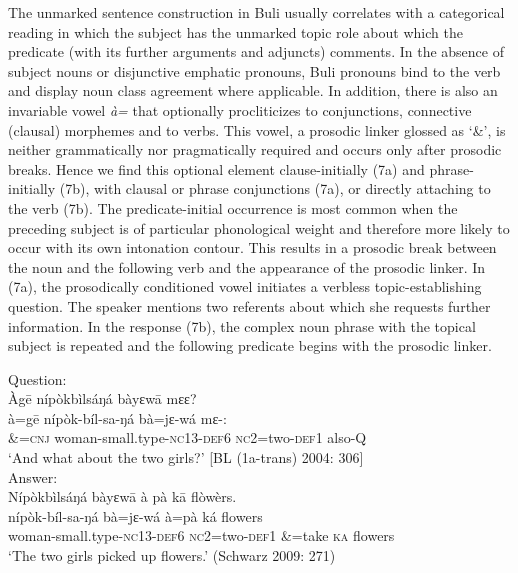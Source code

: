 \documentclass[output=paper]{langsci/langscibook}
\begin{document}
The unmarked sentence construction in Buli usually correlates with a categorical reading in which the subject has the unmarked topic role about which the predicate (with its further arguments and adjuncts) comments. In the absence of subject nouns or disjunctive emphatic pronouns, Buli pronouns bind to the verb and display noun class agreement where applicable. In addition, there is also an invariable vowel \textit{\`a=} that optionally procliticizes to conjunctions, connective (clausal) morphemes and to verbs. This vowel, a prosodic linker glossed as ‘\&’, is neither grammatically nor pragmatically required and occurs only after prosodic breaks. Hence we find this optional element clause-initially (7a) and phrase-initially (7b), with clausal or phrase conjunctions (7a), or directly attaching to the verb (7b). The predicate-initial occurrence is most common when the preceding subject is of particular phonological weight and therefore more likely to occur with its own intonation contour. This results in a prosodic break between the noun and the following verb and the appearance of the prosodic linker. In (7a), the prosodically conditioned vowel initiates a verbless topic-establishing question. The speaker mentions two referents about which she requests further information. In the response (7b), the complex noun phrase with the topical subject is repeated and the following predicate begins with the prosodic linker.  

\begin{exe}
	\ex\label{schwarz:7a}\begin{xlist}
		\ex Question: \\ 
        \glll Àg\={e} {nípòkbìlsáŋá}    {bàyɛw\={a}}    {mɛɛ?} \\
			\textup{à=g\={e}}  {nípòk-bíl-sa-ŋá}      {bà=jɛ-wá}    {mɛ-:}\\
			\&=\textsc{cnj}  woman-small.type-\textsc{nc}13-\textsc{def}6  \textsc{nc}2=two-\textsc{def}1  also-\textsc{Q}\\
\glt   ‘And what about the two girls?’ [BL (1a-trans) 2004: 306] \\
		\ex Answer: \\
        \glll Nípòkbìlsáŋá  bàyɛw\={a}  {à pà}  k\={a}  flòwèrs.\\
			 nípòk-bíl-sa-ŋá  bà=jɛ-wá  à=pà  ká  flowers\\
			woman-small.type-\textsc{nc}13-\textsc{def}6  \textsc{nc}2=two-\textsc{def}1  \&=take  \textsc{ka}  flowers\\
    \glt ‘The two girls picked up flowers.’ (Schwarz 2009: 271)
	\end{xlist}
\end{exe}
\end{document}
